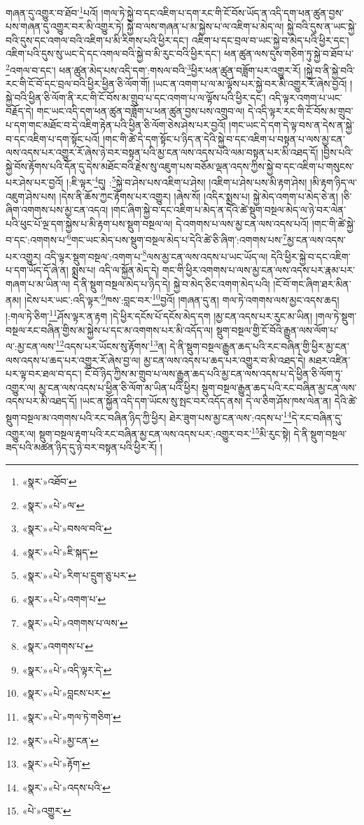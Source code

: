 གཞན་དུ་འགྱུར་བ་ཐོབ་\footnote{«སྣར་»འཐོབ་}པའོ། །གལ་ཏེ་སྐྱེ་བ་དང་འཇིག་པ་དག་རང་གི་ངོ་བོས་ཡོད་ན་འདི་དག་ཕན་ཚུན་བྱས་པས་གཞན་དུ་འགྱུར་བར་མི་འགྱུར་ཏེ། སྐྱེ་བ་ལས་གཞན་པ་མ་སྐྱེས་པ་ལ་འཇིག་པ་མེད་ལ། སྐྱེ་བའི་དུས་ན་ཡང་སྐྱེ་བའི་དུས་དང་འགལ་བའི་འཇིག་པ་མི་རིགས་པའི་ཕྱིར་དང་། འཇིག་པ་དང་བྲལ་བ་ཡང་སྐྱེ་བ་མེད་པའི་ཕྱིར་དང་། འཇིག་པའི་དུས་སུ་ཡང་དེ་དང་འགལ་བའི་སྐྱེ་བ་མི་རུང་བའི་ཕྱིར་དང་། ཕན་ཚུན་ལས་དུས་གཅིག་ཏུ་སྐྱེ་བ་ཐོབ་པ་\footnote{«སྣར་»«པེ་»ལ་}འགལ་བ་དང་། ཕན་ཚུན་མེད་པས་འདི་དག་:གསལ་བའི་\footnote{«སྣར་»«པེ་»བསལ་བའི་}ཕྱིར་ཕན་ཚུན་བཟློག་པར་འགྱུར་རོ། །སྐྱེ་བ་ནི་སྐྱེ་བའི་རང་གི་ངོ་བོ་དང་བྲལ་བའི་ཕྱིར་ཕྱིན་ཅི་ལོག་གོ། །ཡང་ན་འགག་པ་ལ་མ་ལྟོས་པར་སྐྱེ་བར་མི་འགྱུར་རོ་ཞེས་བྱའོ། །སྐྱེ་བའི་ཕྱིན་ཅི་ལོག་ནི་རང་གི་ངོ་བོས་མ་གྲུབ་པ་དང་འགག་པ་ལ་ལྟོས་པའི་ཕྱིར་དང་། འདི་ལྟར་འགག་པ་ཡང་བརྗོད་དེ། གང་ཡང་འདི་དག་ཕན་ཚུན་བཟློག་པ་ཕན་ཚུན་བྱས་པས་འགྲུབ་ལ། དེ་འདི་ལྟར་རང་གི་ངོ་བོས་མ་གྲུབ་པ་དག་གང་མཐོང་བ་དེ་འཇིག་རྟེན་པའི་ཕྱིན་ཅི་ལོག་ཅེས་ཤེས་པར་བྱའོ། །གང་ཡང་དེ་དག་དེ་ལྟ་བས་ན་དེས་ན་སྐྱེ་བ་དང་འཇིག་པ་དག་སྟོང་པའོ། །གང་གི་ཚེ་དེ་དག་སྟོང་པ་ཉིད་ན་དེའི་སྐྱེ་བ་དང་འཇིག་པ་བསྟན་པ་ལས་མྱ་ངན་ལས་འདས་པར་འགྱུར་རོ་ཞེས་ཉེ་བར་བསྟན་པའི་མྱ་ངན་ལས་འདས་པའི་ལམ་བསྟན་པར་མི་འཐད་དོ། །བྱིས་པའི་སྐྱེ་བོས་རྟོགས་པའི་དོན་དུ་དེས་མཐོང་བའི་རྗེས་སུ་འཇུག་པས་བཅོམ་ལྡན་འདས་ཀྱིས་སྐྱེ་བ་དང་འཇིག་པ་གསུངས་པར་ཤེས་པར་བྱའོ། །:ཇི་ལྟར་\footnote{«སྣར་»«པེ་»ཇི་སྐད་}དུ། :\footnote{«སྣར་»«པེ་»རིག་པ་དྲུག་ཅུ་པར་}སྐྱེ་བ་ཤེས་པས་འཇིག་པ་ཤེས། །འཇིག་པ་ཤེས་པས་མི་རྟག་ཤེས། །མི་རྟག་ཉིད་ལ་འཇུག་ཤེས་པས། །དེས་ནི་ཆོས་ཀྱང་རྟོགས་པར་འགྱུར། །ཞེས་སོ། །འདིར་སྨྲས་པ། སྐྱེ་མེད་འགག་པ་མེད་ཅེ་ན། །ཅི་ཞིག་འགགས་པས་མྱ་ངན་འདའ། །གང་ཞིག་སྐྱེ་བ་དང་འཇིག་པ་མེད་ན་དེའི་ཚེ་སྡུག་བསྔལ་མེད་ལ་ཉེ་བར་ལེན་པའི་ཕུང་པོ་ལྔ་དག་སྐྱེས་པ་མི་རྟག་པས་སྡུག་བསྔལ་ལ། དེ་འགགས་པ་ལས་མྱ་ངན་ལས་འདས་པའོ། །གང་གི་ཚེ་སྐྱེ་བ་དང་:འགགས་པ་\footnote{«སྣར་»«པེ་»འགག་པ་}གང་ཡང་མེད་པས་སྡུག་བསྔལ་མེད་པ་དེའི་ཚེ་ཅི་ཞིག་:འགགས་པས་\footnote{«སྣར་»«པེ་»འགགས་པ་ལས་}མྱ་ངན་ལས་འདས་པར་འགྱུར། འདི་ལྟར་སྡུག་བསྔལ་:འགག་པ་\footnote{«སྣར་»འགགས་པ་}ལས་མྱ་ངན་ལས་འདས་པ་ཡང་ཡོད་ལ། དེའི་ཕྱིར་སྐྱེ་བ་དང་འཇིག་པ་དག་ཡོད་དོ་ཞེ་ན། སྨྲས་པ། འདི་ལ་སྐྱོན་མེད་དེ། གང་གི་ཕྱིར་འགགས་པ་ལས་མྱ་ངན་ལས་འདས་པར་རྣམ་པར་གཞག་པ་མ་ཡིན་ལ། དེ་ནི་སྡུག་བསྔལ་མེད་པ་ཉིད་དེ། སྐྱེ་བ་མེད་ཅིང་འགག་མེད་པའི། །ངོ་བོ་གང་ཞིག་ཐར་མིན་ནམ། །ངེས་པར་ཡང་:འདི་ལྟར་\footnote{«སྣར་»«པེ་»འདི་ལྟར་དེ་}ཁས་:བླང་བར་\footnote{«སྣར་»«པེ་»བླངས་པར་}བྱའོ། །གཞན་དུ་ན། གལ་ཏེ་འགགས་ལས་མྱང་འདས་ཆད། །:གལ་ཏེ་ཅིག་\footnote{«སྣར་»«པེ་»གལ་ཏེ་གཅིག་}ཤོས་ལྟར་ན་རྟག །དེ་ཕྱིར་དངོས་པོ་དངོས་མེད་དག །མྱ་ངན་འདས་པར་རུང་མ་ཡིན། །གལ་ཏེ་སྡུག་བསྔལ་རང་བཞིན་གྱིས་མ་སྐྱེས་པ་དང་མ་འགགས་པར་མི་འདོད་ལ། སྡུག་བསྔལ་གྱི་ངོ་བོའི་རྒྱུན་ལས་ལོག་པ་ལ་:མྱ་ངན་ལས་\footnote{«སྣར་»«པེ་»མྱ་ངན་}འདས་པར་ཡོངས་སུ་རྟོགས་\footnote{«སྣར་»«པེ་»རྟོག་}ན། དེ་ནི་སྡུག་བསྔལ་རྒྱུན་ཆད་པའི་རང་བཞིན་གྱི་ཕྱིར་མྱ་ངན་ལས་འདས་པ་ཆད་པར་འགྱུར་རོ་ཞེས་བྱ་ལ། མྱ་ངན་ལས་འདས་པ་ཆད་པར་འགྱུར་བ་མི་འཐད་དེ། མཐར་འཛིན་པར་ལྟ་བར་ཐལ་བ་དང་། ངོ་བོ་ཉིད་ཀྱིས་མ་གྲུབ་པ་ལས་རྒྱུན་ཆད་པའི་མྱ་ངན་ལས་འདས་པ་དེ་ཕྱིན་ཅི་ལོག་ཏུ་འགྱུར་ལ། མྱ་ངན་ལས་འདས་པ་ཕྱིན་ཅི་ལོག་མ་ཡིན་པའི་ཕྱིར། སྡུག་བསྔལ་རྒྱུན་ཆད་པའི་རང་བཞིན་མྱ་ངན་ལས་འདས་པར་མི་འཐད་དོ། །ཡང་ན་སྐྱོན་འདི་དག་ཡོངས་སུ་སྤང་བར་འདོད་ནས། དེ་ལ་ཅིག་ཤོས་ཁས་ལེན་ན། དེའི་ཚེ་སྡུག་བསྔལ་མ་འགགས་པའི་རང་བཞིན་ཉིད་ཀྱི་ཕྱིར། ཐེར་ཟུག་པས་མྱ་ངན་ལས་:འདས་པ་\footnote{«སྣར་»«པེ་»འདས་པའི་}དེ་རང་བཞིན་དུ་འགྱུར་ལ། སྡུག་བསྔལ་རྟག་པའི་རང་བཞིན་མྱ་ངན་ལས་འདས་པར་:འགྱུར་བར་\footnote{«པེ་»འགྱུར་}མི་རུང་སྟེ། དེ་ནི་སྡུག་བསྔལ་ཟད་པའི་མཚན་ཉིད་དུ་ཉེ་བར་བསྟན་པའི་ཕྱིར་རོ། །
